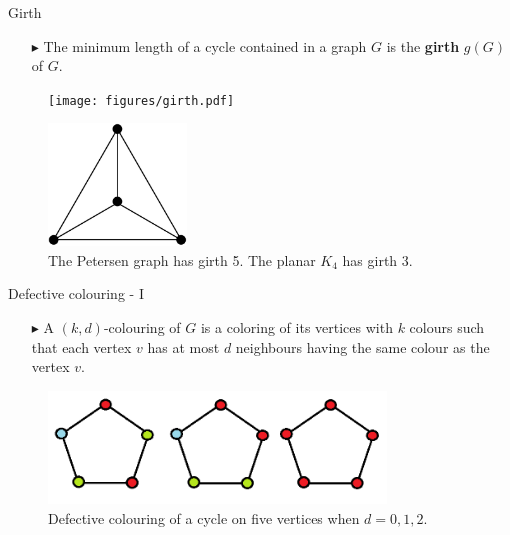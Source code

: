 \documentclass[10pt, compress]{beamer}
\begin{document}
\begin{frame}{Girth}
\begin{itemize}
\item[$\blacktriangleright$] The minimum length of a cycle contained in a graph $G$ is the \textbf{girth} $g(G)$ of $G$.
\end{itemize}
\begin{figure}[!tbp]
\centering
\begin{minipage}[b]{0.4\textwidth}
\texttt{[image: figures/girth.pdf]}
\end{minipage}
\hfill
\begin{minipage}[b]{0.4\textwidth}
\includegraphics[width=\textwidth,height=3.25cm]{figures/triangle.png}
\end{minipage}
\caption{The Petersen graph has girth 5. The planar $K_4$ has girth 3. \cite{girth}}
\end{figure}
\end{frame}

\begin{frame}{Defective colouring - I}
\begin{itemize}
\item[$\blacktriangleright$] A $(k, d)$-colouring of $G$ is a coloring of its vertices with $k$ colours such that each vertex $v$ has at most $d$ neighbours having the same colour as the vertex $v$. 
\end{itemize}
\begin{figure}
\centering
\includegraphics[width=0.8\textwidth]{figures/defect.png}
\caption{Defective colouring of a cycle on five vertices when $d = 0, 1, 2$. \cite{defect}}
\label{fig:defect}
\end{figure}
\end{frame}
\end{document}
